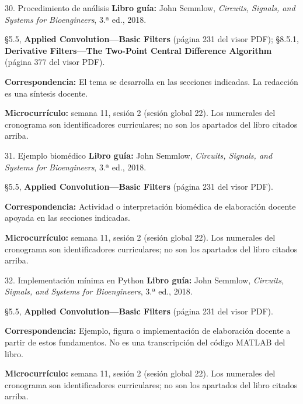 \documentclass[
  10pt,
  ignorenonframetext,
  aspectratio=169,
  spanish,
]{beamer}
\begin{document}
\begin{frame}{30. Procedimiento de análisis}
\label{procedimiento-de-anuxe1lisis-1}
\textbf{Libro guía:} John Semmlow, \emph{Circuits, Signals, and Systems
for Bioengineers}, 3.ª ed., 2018.

§5.5, \textbf{Applied Convolution---Basic Filters} (página 231 del visor
PDF); §8.5.1, \textbf{Derivative Filters---The Two-Point Central
Difference Algorithm} (página 377 del visor PDF).

\textbf{Correspondencia:} El tema se desarrolla en las secciones
indicadas. La redacción es una síntesis docente.

\textbf{Microcurrículo:} semana 11, sesión 2 (sesión global 22). Los
numerales del cronograma son identificadores curriculares; no son los
apartados del libro citados arriba.
\end{frame}

\begin{frame}{31. Ejemplo biomédico}
\label{ejemplo-biomuxe9dico-1}
\textbf{Libro guía:} John Semmlow, \emph{Circuits, Signals, and Systems
for Bioengineers}, 3.ª ed., 2018.

§5.5, \textbf{Applied Convolution---Basic Filters} (página 231 del visor
PDF).

\textbf{Correspondencia:} Actividad o interpretación biomédica de
elaboración docente apoyada en las secciones indicadas.

\textbf{Microcurrículo:} semana 11, sesión 2 (sesión global 22). Los
numerales del cronograma son identificadores curriculares; no son los
apartados del libro citados arriba.
\end{frame}

\begin{frame}{32. Implementación mínima en Python}
\label{implementaciuxf3n-muxednima-en-python-1}
\textbf{Libro guía:} John Semmlow, \emph{Circuits, Signals, and Systems
for Bioengineers}, 3.ª ed., 2018.

§5.5, \textbf{Applied Convolution---Basic Filters} (página 231 del visor
PDF).

\textbf{Correspondencia:} Ejemplo, figura o implementación de
elaboración docente a partir de estos fundamentos. No es una
transcripción del código MATLAB del libro.

\textbf{Microcurrículo:} semana 11, sesión 2 (sesión global 22). Los
numerales del cronograma son identificadores curriculares; no son los
apartados del libro citados arriba.
\end{frame}
\end{document}
